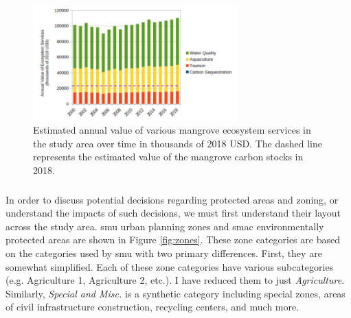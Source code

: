 \begin{figure}[!htb] 
\centering
\includegraphics[width=0.7\textwidth]{Figures/chap4/annual_ecosystem_services.png}
\caption[Annual Value of Mangrove Ecosystem Services]{Estimated annual value of various mangrove ecosystem services in the study area over time in thousands of 2018 USD. The dashed line represents the estimated value of the mangrove carbon stocks in 2018.}
\label{fig:annual_ecosystem_services}
\end{figure}


\subsubsection{} \label{sec:rio-evdt-decision-results}

In order to discuss potential decisions regarding protected areas and zoning, or understand the impacts of such decisions, we must first understand their layout across the study area. \ac{smu} urban planning zones \cite{institutopereirapassosAreasProtegidas2021} and \ac{smac} environmentally protected areas \cite{institutopereirapassosSetores2022} are shown in Figure \ref{fig:zones}. These zone categories are based on the categories used by \ac{smu} with two primary differences. First, they are somewhat simplified. Each of these zone categories have various subcategories (e.g. Agriculture 1, Agriculture 2, etc.). I have reduced them to just \textit{Agriculture}. Similarly, \textit{Special and Misc.} is a synthetic category including special zones, areas of civil infrastructure construction, recycling centers, and much more. 

